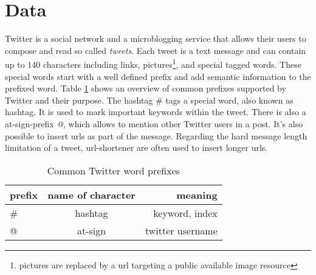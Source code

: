 \section{Data}
Twitter is a social network and a microblogging service that
allows their users to compose and read so called 
\emph{tweets}. Each tweet 
is a text message and can contain up to 140 characters
including links, pictures\footnote{pictures are replaced 
by a url targeting a public available image resource}, and special tagged words.
These special words start with a well defined prefix 
and add semantic information to the prefixed word.
Table \ref{tab:twitterprefixes} shows an overview of 
common prefixes supported by Twitter and their purpose. 
The hashtag \# tags a special word, also known as hashtag. 
It is used to mark important keywords within the tweet.
There is also a at-sign-prefix \emph{@}, which allows 
to mention other Twitter users in a post. It's also possible to 
insert urls as part of the message. Regarding the hard message 
length limitation of a tweet, url-shortener are often used to
 insert longer urls.

\begin{table}[H]
\centering
\begin{tabular}{ l | c | r }                 
  prefix & name of character & meaning  \\
  \hline
  \# &  hashtag & keyword, index \\
  @ & at-sign & twitter username \\
  \hline
\end{tabular}
\caption{Common Twitter word prefixes}
\label{tab:twitterprefixes}
\end{table}